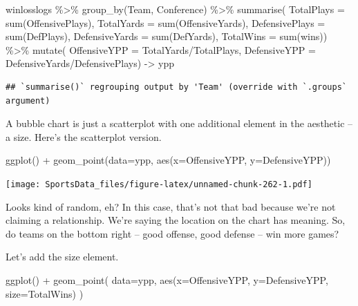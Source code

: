 \documentclass[
]{book}
\newenvironment{Shaded}{\begin{snugshade}}{\end{snugshade}}
\newcommand{\AttributeTok}[1]{\textcolor[rgb]{0.77,0.63,0.00}{#1}}
\newcommand{\FunctionTok}[1]{\textcolor[rgb]{0.00,0.00,0.00}{#1}}
\newcommand{\NormalTok}[1]{#1}
\newcommand{\OtherTok}[1]{\textcolor[rgb]{0.56,0.35,0.01}{#1}}
\newcommand{\SpecialCharTok}[1]{\textcolor[rgb]{0.00,0.00,0.00}{#1}}
\begin{document}
\begin{Shaded}
\begin{Highlighting}[]
\NormalTok{winlosslogs }\SpecialCharTok{\%\textgreater{}\%} 
  \FunctionTok{group\_by}\NormalTok{(Team, Conference) }\SpecialCharTok{\%\textgreater{}\%} 
  \FunctionTok{summarise}\NormalTok{(}
    \AttributeTok{TotalPlays =} \FunctionTok{sum}\NormalTok{(OffensivePlays), }
    \AttributeTok{TotalYards =} \FunctionTok{sum}\NormalTok{(OffensiveYards), }
    \AttributeTok{DefensivePlays =} \FunctionTok{sum}\NormalTok{(DefPlays), }
    \AttributeTok{DefensiveYards =} \FunctionTok{sum}\NormalTok{(DefYards), }
    \AttributeTok{TotalWins =} \FunctionTok{sum}\NormalTok{(wins)) }\SpecialCharTok{\%\textgreater{}\%} 
  \FunctionTok{mutate}\NormalTok{(}
    \AttributeTok{OffensiveYPP =}\NormalTok{ TotalYards}\SpecialCharTok{/}\NormalTok{TotalPlays, }
    \AttributeTok{DefensiveYPP =}\NormalTok{ DefensiveYards}\SpecialCharTok{/}\NormalTok{DefensivePlays) }\OtherTok{{-}\textgreater{}}\NormalTok{ ypp}
\end{Highlighting}
\end{Shaded}

\begin{verbatim}
## `summarise()` regrouping output by 'Team' (override with `.groups` argument)
\end{verbatim}

A bubble chart is just a scatterplot with one additional element in the aesthetic -- a size. Here's the scatterplot version.

\begin{Shaded}
\begin{Highlighting}[]
\FunctionTok{ggplot}\NormalTok{() }\SpecialCharTok{+} \FunctionTok{geom\_point}\NormalTok{(}\AttributeTok{data=}\NormalTok{ypp, }\FunctionTok{aes}\NormalTok{(}\AttributeTok{x=}\NormalTok{OffensiveYPP, }\AttributeTok{y=}\NormalTok{DefensiveYPP))}
\end{Highlighting}
\end{Shaded}

\texttt{[image: SportsData\_files/figure-latex/unnamed-chunk-262-1.pdf]}

Looks kind of random, eh? In this case, that's not that bad because we're not claiming a relationship. We're saying the location on the chart has meaning. So, do teams on the bottom right -- good offense, good defense -- win more games?

Let's add the size element.

\begin{Shaded}
\begin{Highlighting}[]
\FunctionTok{ggplot}\NormalTok{() }\SpecialCharTok{+} 
  \FunctionTok{geom\_point}\NormalTok{(}
    \AttributeTok{data=}\NormalTok{ypp, }
    \FunctionTok{aes}\NormalTok{(}\AttributeTok{x=}\NormalTok{OffensiveYPP, }\AttributeTok{y=}\NormalTok{DefensiveYPP, }\AttributeTok{size=}\NormalTok{TotalWins)}
\NormalTok{    )}
\end{Highlighting}
\end{Shaded}
\end{document}
